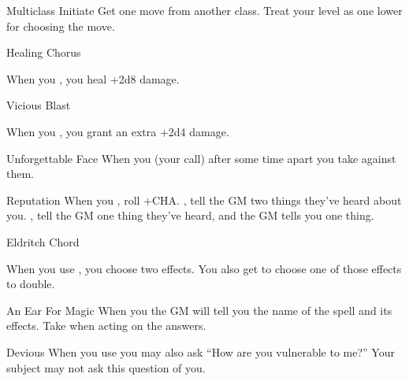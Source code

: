 \documentclass[8pt]{extarticle}
\begin{document}
\begin{multicols}{2}
\begin{amove}{Multiclass Initiate}
  Get one move from another class. Treat your level as one lower for
  choosing the move.
\end{amove}

\vfill\null
\columnbreak

\secondAdvances

\begin{amove}{Healing Chorus}

  When you , you heal +2d8 damage.
\end{amove}


\begin{amove}{Vicious Blast}

  When you , you
  grant an extra +2d4 damage.
\end{amove}


\begin{amove}{Unforgettable Face}
  When you  (your call)
  after some time apart you take  against them.
\end{amove}


\begin{amove}{Reputation}
  When you ,
  roll +CHA. \onSuccess, tell the GM two things they’ve heard about
  you. \onPartial, tell the GM one thing they’ve heard, and the GM
  tells you one thing.
\end{amove}


\begin{amove}{Eldritch Chord}

  When you use , you choose two effects. You also get to
  choose one of those effects to double.
\end{amove}


\begin{amove}{An Ear For Magic}
  When you  the GM will tell you
  the name of the spell and its effects. Take  when acting
  on the answers.
\end{amove}


\begin{amove}{Devious}
  When you use  you may also ask “How are you
  vulnerable to me?” Your subject may not ask this question of you.
\end{amove}



\end{multicols}
\end{document}
